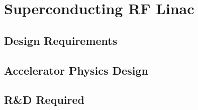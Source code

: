 \section{Superconducting RF Linac}

\subsection{Design Requirements}

\subsection{Accelerator Physics Design}

\subsection{R\&D Required}

\blankline
\blankline
